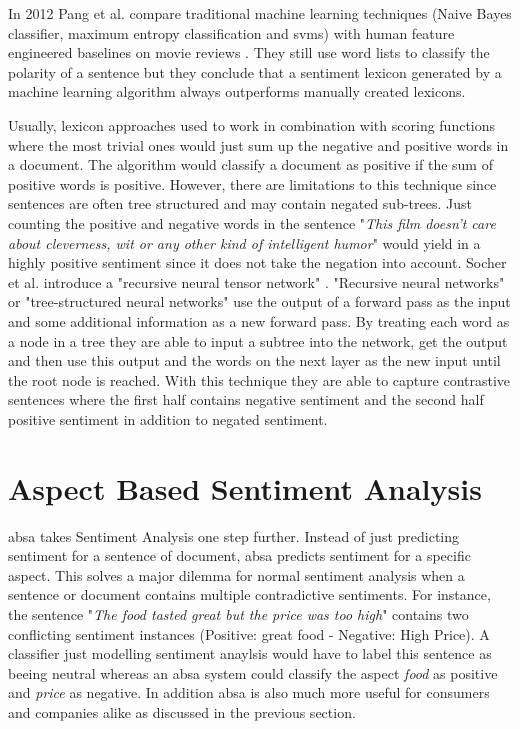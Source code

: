 In 2012 Pang et al. compare traditional machine learning techniques {(Naive Bayes classifier, maximum entropy classification and \glspl{svm})} with human feature engineered baselines on movie reviews \cite{Pang2012}. They still use word lists to classify the polarity of a sentence but they conclude that a sentiment lexicon generated by a machine learning algorithm always outperforms manually created lexicons.
\medskip


Usually, lexicon approaches used to work in combination with scoring functions where the most trivial ones would just sum up the negative and positive words in a document. The algorithm would classify a document as positive if the sum of positive words is positive. However, there are limitations to this technique since sentences are often tree structured and may contain negated sub-trees. Just counting the positive and negative words in the sentence "\textit{This film doesn't care about cleverness, wit or any other kind of intelligent humor}" would yield in a highly positive sentiment since it does not take the negation into account. Socher et al. introduce a "recursive neural tensor network" \cite{Socher2013}. "Recursive neural networks" or "tree-structured neural networks" use the output of a forward pass as the input and some additional information as a new forward pass. By treating each word as a node in a tree they are able to input a subtree into the network, get the output and then use this output and the words on the next layer as the new input until the root node is reached. With this technique they are able to capture contrastive sentences where the first half contains negative sentiment and the second half positive sentiment in addition to negated sentiment. 
\medskip

\section{Aspect Based Sentiment Analysis}
\label{sec:02_absa}

\acrfull{absa} takes Sentiment Analysis one step further. Instead of just predicting sentiment for a sentence of document, \gls{absa} predicts sentiment for a specific aspect. This solves a major dilemma for normal sentiment analysis when a sentence or document contains multiple contradictive sentiments. For instance, the sentence "\textit{The food tasted great but the price was too high}" contains two conflicting sentiment instances {(Positive: great food - Negative: High Price)}. A classifier just modelling sentiment anaylsis would have to label this sentence as beeing neutral whereas an \gls{absa} system could classify the aspect \textit{food} as positive and \textit{price} as negative. In addition \gls{absa} is also much more useful for consumers and companies alike as discussed in the previous section.
\medskip

